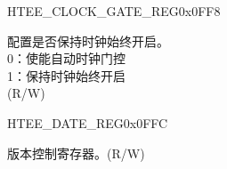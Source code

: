 \begin{register}{H}{TEE\_CLOCK\_GATE\_REG}{0x0FF8}\label{regdesc:TEECLOCKGATEREG}
%
%
\regnewline%
\begin{regdesc}\begin{reglist}
\label{fielddesc:TEECLKEN}\item [TEE\_CLK\_EN] 配置是否保持时钟始终开启。\\
0：使能自动时钟门控 \\
1：保持时钟始终开启 \\ 
(R/W)
\end{reglist}\end{regdesc}
\end{register}


\begin{register}{H}{TEE\_DATE\_REG}{0x0FFC}\label{regdesc:TEEDATEREG}
%
%
\regnewline%
\begin{regdesc}\begin{reglist}
\label{fielddesc:TEEDATE}\item [TEE\_DATE] 版本控制寄存器。(R/W)
\end{reglist}\end{regdesc}
\end{register}


